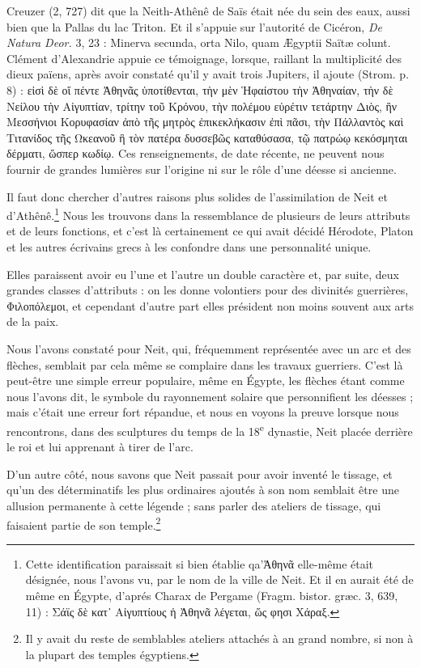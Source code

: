 \documentclass[a4paper, 11pt, oneside]{article}
\begin{document}
Creuzer (2, 727) dit que la Neith-Athênê de Saïs était née du sein des eaux, aussi bien que la Pallas du lac Triton. Et il s'appuie sur l'autorité de Cicéron, \emph{De Natura Deor.} 3, 23 : Minerva secunda, orta Nilo, quam Ægyptii Saïtæ colunt. Clément d'Alexandrie appuie ce témoignage, lorsque, raillant la multiplicité des dieux païens, après avoir constaté qu'il y avait trois Jupiters, il ajoute (Strom. p. 8) : εἰσὶ δὲ οἵ πέντε Ἀθηνᾶς ὑποτίθενται, τὴν μὲν Ἡφαίστου τὴν Ἀθηναίαν, τὴν δὲ Νείλου τὴν Αἰγυπτίαν, τρίτην τοῦ Κρόνου, τὴν πολέμου εὑρέτιν τετάρτην Διὸς, ἣν Μεσσήνιοι Κορυφασίαν ἀπὸ τῆς μητρὸς ἐπικεκλήκασιν ἐπὶ πᾶσι, τὴν Πάλλαντὸς καὶ Τιτανίδος τῆς Ωκεανοῦ ἣ τὸν πατέρα δυσσεβῶς καταθύσασα, τῷ πατρώῳ κεκόσμηται δέρματι, ὥσπερ κωδίῳ. Ces renseignements, de date récente, ne peuvent nous fournir de grandes lumières sur l'origine ni sur le rôle d'une déesse si ancienne.

Il faut donc chercher d'autres raisons plus solides de l'assimilation de Neit et d'Athênê.\footnote{Cette identification paraissait si bien établie qa'Ἀθηνᾶ elle-même était désignée, nous l'avons vu, par le nom de la ville de Neit. Et il en aurait été de même en Égypte, d'aprés Charax de Pergame (Fragm. bistor. græc. 3, 639, 11) : Σάϊς δὲ κατ᾽ Αἰγυπτίους ἡ Ἀθηνᾶ λέγεται, ὥς φησι Χάραξ.} Nous les trouvons dans la ressemblance de plusieurs de leurs attributs et de leurs fonctions, et c'est là certainement ce qui avait décidé Hérodote, Platon et les autres écrivains grecs à les confondre dans une personnalité unique.

Elles paraissent avoir eu l'une et l'autre un double caractère et, par suite, deux grandes classes d'attributs : on les donne volontiers pour des divinités guerrières, Φιλοπόλεμοι, et cependant d'autre part elles président non moins souvent aux arts de la paix.

Nous l'avons constaté pour Neit, qui, fréquemment représentée avec un arc et des flèches, semblait par cela même se complaire dans les travaux guerriers. C'est là peut-être une simple erreur populaire, même en Égypte, les flèches étant comme nous l'avons dit, le symbole du rayonnement solaire que personnifient les déesses ; mais c'était une erreur fort répandue, et nous en voyons la preuve lorsque nous rencontrons, dans des sculptures du temps de la 18\textsuperscript{e} dynastie, Neit placée derrière le roi et lui apprenant à tirer de l'arc.

D'un autre côté, nous savons que Neit passait pour avoir inventé le tissage, et qu'un des déterminatifs les plus ordinaires ajoutés à son nom semblait être une allusion permanente à cette légende ; sans parler des ateliers de tissage, qui faisaient partie de son temple.\footnote{Il y avait du reste de semblables ateliers attachés à an grand nombre, si non à la plupart des temples égyptiens.}
\end{document}
